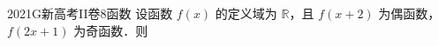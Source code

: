 
\begin{problem}{2021}{G}{新高考II卷}{8}{函数}
设函数 $ f(x) $ 的定义域为 $ \mathbb{R} $，且 $ f(x+2) $ 为偶函数，$ f(2x+1) $ 为奇函数．则
\begin{choices}
\end{choices}
\end{problem}

\begin{answer}

\end{answer}

\begin{solutions}

\end{solutions}